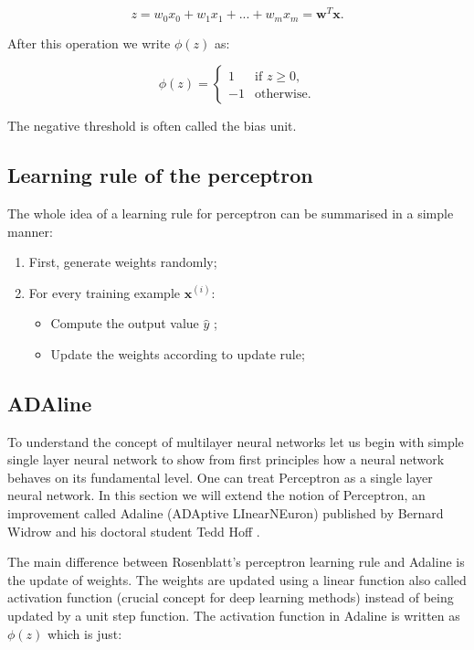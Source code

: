 \documentclass[a4paper,oneside,openright,11pt]{book}
\begin{document}
\begin{equation*}
    z = w_{0}x_{0} + w_{1}x_{1} + ... + w_{m}x_{m} = \textbf{w}^{T}\textbf{x}.
\end{equation*}

After this operation we write $\phi(z)$ as:

\begin{equation}
    \phi(z) = 
\begin{cases}
     1  & \text{if } z \geq 0, \\
-1  & \text{otherwise.}
\end{cases}
\end{equation}


The negative threshold is often called the bias unit.\cite{raschka}

\subsection{Learning rule of the perceptron}


The whole idea of a learning rule for perceptron can be summarised in a simple manner:

\begin{enumerate}
    \item First, generate weights randomly;
    \item For every training example $\textbf{x}^{(i)}$:
    \begin{itemize}
        \item Compute the output value $\hat{{y}}$ ;
        \item Update the weights according to update rule;
    \end{itemize}
\end{enumerate}

\subsection{ADAline}

To understand the concept of multilayer neural networks let us begin with simple single layer neural network to show from first principles how a neural network behaves on its fundamental level. One can treat Perceptron as a single layer neural network. In this section we will extend the notion of Perceptron, an improvement called Adaline (ADAptive LInearNEuron) published by Bernard Widrow and his doctoral student Tedd Hoff \cite{adaline}.

The main difference between Rosenblatt's perceptron learning rule and Adaline is the update of weights. The weights are updated using a linear function also called activation function (crucial concept for deep learning methods) instead of being updated by a unit step function. The activation function in Adaline is written as $\phi(z)$ which is just:
\end{document}
